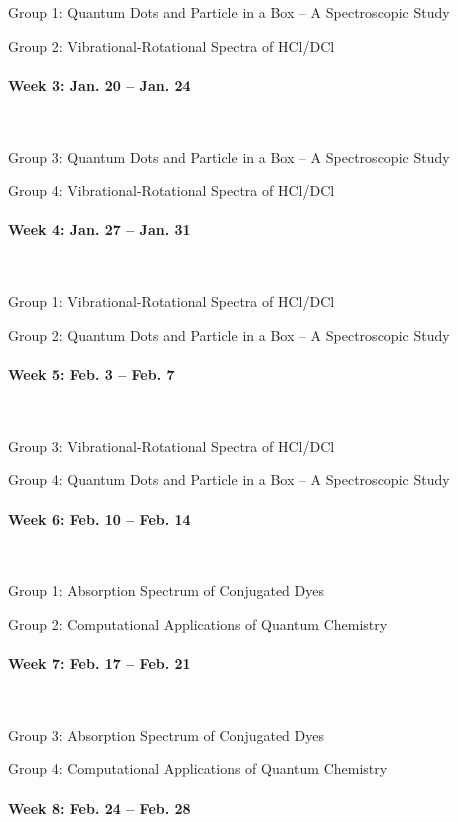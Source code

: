 \documentclass[12pt, letterpaper]{article}
\begin{document}
Group 1: Quantum Dots and Particle in a Box – A Spectroscopic Study

Group 2: Vibrational-Rotational Spectra of HCl/DCl
\paragraph{Week 3: Jan. 20 -- Jan. 24}~

Group 3: Quantum Dots and Particle in a Box – A Spectroscopic Study

Group 4: Vibrational-Rotational Spectra of HCl/DCl

\paragraph{Week 4: Jan. 27 -- Jan. 31}~

Group 1: Vibrational-Rotational Spectra of HCl/DCl

Group 2: Quantum Dots and Particle in a Box – A Spectroscopic Study
\paragraph{Week 5: Feb. 3 -- Feb. 7}~

Group 3: Vibrational-Rotational Spectra of HCl/DCl

Group 4: Quantum Dots and Particle in a Box – A Spectroscopic Study

\paragraph{Week 6: Feb. 10 -- Feb. 14}~

Group 1: Absorption Spectrum of Conjugated Dyes

Group 2: Computational Applications of Quantum Chemistry

\paragraph{Week 7: Feb. 17 -- Feb. 21}~

Group 3: Absorption Spectrum of Conjugated Dyes

Group 4: Computational Applications of Quantum Chemistry

\paragraph{Week 8: Feb. 24 -- Feb. 28}~
\end{document}
